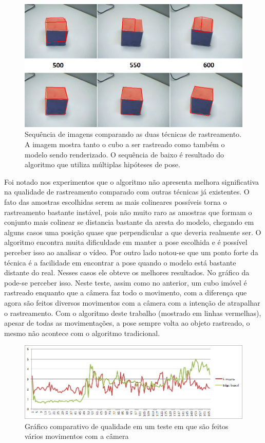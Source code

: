 \begin{figure}[!t]
\centering\includegraphics[width=\textwidth]{monografia/sequencia_cubo_real}
\caption{Sequência de imagens comparando as duas técnicas de rastreamento. A imagem mostra tanto o cubo a ser rastreado como também o modelo sendo renderizado. O sequência de baixo é resultado do algoritmo que utiliza múltiplas hipóteses de pose.}
\label{sequencia_cubo_real}
\end{figure}

Foi notado nos experimentos que o algoritmo não apresenta melhora significativa na qualidade de rastreamento comparado com outras técnicas já existentes. O fato das amostras escolhidas serem as mais colineares possíveis torna o rastreamento bastante instável, pois não muito raro as amostras que formam o conjunto mais colinear se distancia bastante da aresta do modelo, chegando em alguns casos uma posição quase que perpendicular a que deveria realmente ser. O algoritmo encontra muita dificuldade em manter a pose escolhida e é possível perceber isso ao analisar o vídeo. Por outro lado notou-se que um ponto forte da técnica é a facilidade em encontrar a pose quando o modelo está bastante distante do real. Nesses casos ele obteve os melhores resultados. No gráfico da  pode-se perceber isso. Neste teste, assim como no anterior, um cubo imóvel é rastreado enquanto que a câmera faz todo o movimento, com a diferença que agora são feitos diversos movimentos com a câmera com a intenção de atrapalhar o rastreamento. Com o algoritmo deste trabalho (mostrado em linhas vermelhas), apesar de todas as movimentações, a pose sempre volta ao objeto rastreado, o mesmo não acontece com o algoritmo tradicional.

\begin{figure}[!ht]
\centering\includegraphics[width=\textwidth]{monografia/qualidade_celine_boa}
\caption{Gráfico comparativo de qualidade em um teste em que são feitos vários movimentos com a câmera}
\label{qualidade_celine_boa}
\end{figure}

